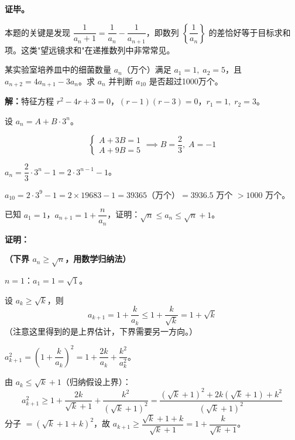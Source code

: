 \documentclass[12pt, a4paper]{ctexart}
\begin{document}
\textbf{证毕。}

\begin{tipbox}[方法总结]
本题的关键是发现 $\dfrac{1}{a_n+1} = \dfrac{1}{a_n} - \dfrac{1}{a_{n+1}}$，即数列 $\left\{\dfrac{1}{a_n}\right\}$ 的差恰好等于目标求和项。这类"望远镜求和"在递推数列中非常常见。
\end{tipbox}

\begin{examplebox}[【例题11】特征方程法解决实际递推问题]
某实验室培养皿中的细菌数量 $a_n$（万个）满足 $a_1 = 1,\;a_2 = 5$，且 $a_{n+2} = 4a_{n+1} - 3a_n$。求 $a_n$ 并判断 $a_{10}$ 是否超过1000万个。
\end{examplebox}

\textbf{解：}特征方程 $r^2 - 4r + 3 = 0$，$(r-1)(r-3) = 0$，$r_1 = 1,\;r_2 = 3$。

设 $a_n = A + B \cdot 3^n$。

\[
\begin{cases}
A + 3B = 1 \\
A + 9B = 5
\end{cases}
\implies B = \frac{2}{3},\;A = -1
\]

$a_n = \dfrac{2}{3}\cdot 3^n - 1 = 2\cdot 3^{n-1} - 1$。

$a_{10} = 2\cdot 3^9 - 1 = 2\times 19683 - 1 = 39365$（万个）$= 3936.5$ 万个 $> 1000$ 万个。\;\checkmark

\begin{examplebox}[【例题12】数列不等式的归纳证明]
已知 $a_1 = 1$，$a_{n+1} = 1 + \dfrac{n}{a_n}$，证明：$\sqrt{n} \leq a_n \leq \sqrt{n} + 1$。
\end{examplebox}

\textbf{证明：}

\textbf{（下界 $a_n \geq \sqrt{n}$，用数学归纳法）}

$n=1$：$a_1 = 1 = \sqrt{1}$。\;\checkmark

设 $a_k \geq \sqrt{k}$，则
\[
a_{k+1} = 1 + \frac{k}{a_k} \leq 1 + \frac{k}{\sqrt{k}} = 1 + \sqrt{k}
\]
（注意这里得到的是上界估计，下界需要另一方向。）

$a_{k+1}^2 = \left(1+\dfrac{k}{a_k}\right)^2 = 1 + \dfrac{2k}{a_k} + \dfrac{k^2}{a_k^2}$。

由 $a_k \leq \sqrt{k}+1$（归纳假设上界）：
\[
a_{k+1}^2 \geq 1 + \frac{2k}{\sqrt{k}+1} + \frac{k^2}{(\sqrt{k}+1)^2} = \frac{(\sqrt{k}+1)^2 + 2k(\sqrt{k}+1) + k^2}{(\sqrt{k}+1)^2}
\]
分子 $= (\sqrt{k}+1+k)^2$，故 $a_{k+1} \geq \dfrac{\sqrt{k}+1+k}{\sqrt{k}+1} = 1 + \dfrac{k}{\sqrt{k}+1}$。
\end{document}
